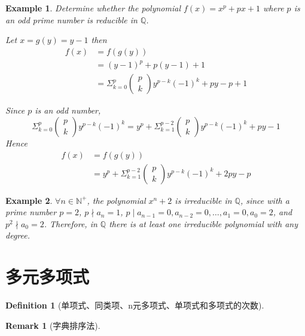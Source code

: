 \documentclass[onecolumn]{ctexart}
\newtheorem{definition}{Definition}
\newtheorem{remark}{Remark}
\newtheorem{example}{Example}
\begin{document}
\begin{example}
  Determine whether the polynomial $f(x) = x^p + px + 1$ where $p$ is an odd 
  prime number is reducible in $\mathbb{Q}$.

  Let $x = g(y) = y - 1$ then 
  \[
    \begin{split}
      f(x) &= f(g(y)) \\
           &= (y - 1)^p + p(y - 1) + 1 \\
           &= \Sigma_{k=0}^p 
              \begin{pmatrix}
                p \\
                k
              \end{pmatrix} y^{p-k}(-1)^k + py - p + 1
    \end{split}
  \]

  Since $p$ is an odd number, 
  \[
    \Sigma_{k=0}^p 
    \begin{pmatrix}
      p \\
      k
    \end{pmatrix} y^{p-k}(-1)^k = y^p + \Sigma_{k=1}^{p-2} 
    \begin{pmatrix}
      p \\
      k
    \end{pmatrix} y^{p-k}(-1)^k + py - 1
  \]
  Hence
  \[
    \begin{split}
      f(x) &= f(g(y)) \\
           &= y^p + \Sigma_{k=1}^{p-2} 
              \begin{pmatrix}
                p \\
                k
              \end{pmatrix} y^{p-k}(-1)^k + 2py - p
    \end{split}
  \]
\end{example}

\begin{example}
  $\forall n \in \mathbb{N}^+$, the polynomial $x^n + 2$ is irreducible in 
  $\mathbb{Q}$, since with a prime number $p = 2$, $p \nmid a_n = 1$, $p \mid 
  a_{n-1} = 0, a_{n-2} = 0, \ldots, a_1 = 0, a_0 = 2$, and $p^2 \nmid a_0 = 2$. 
  Therefore, in $\mathbb{Q}$ there is at least one irreducible polynomial with 
  any degree.
\end{example}

\section{多元多项式}

\begin{definition}[单项式、同类项、n元多项式、单项式和多项式的次数]
  
\end{definition}
\begin{remark}[字典排序法]
  
\end{remark}
\end{document}
